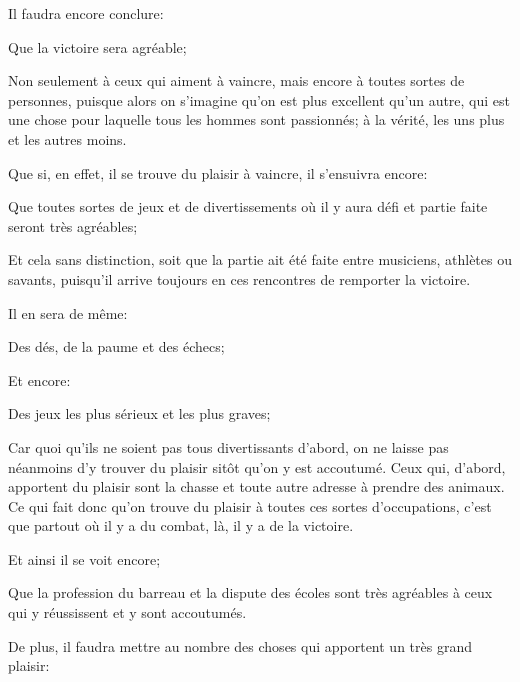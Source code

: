 \bigbreak

Il faudra encore conclure:

\begin{lieu}
	Que la victoire sera agréable;
\end{lieu}

Non seulement à ceux qui aiment à vaincre, mais encore à toutes sortes de personnes, puisque alors on s'imagine
qu'on est plus excellent qu'un autre, qui est une chose pour laquelle tous les hommes sont passionnés; à la
vérité, les uns plus et les autres moins.

\bigbreak

Que si, en effet, il se trouve du plaisir à vaincre, il s'ensuivra encore:

\begin{lieu}
	Que toutes sortes de jeux et de divertissements où il y aura défi et partie faite seront très agréables;
\end{lieu}

Et cela sans distinction, soit que la partie ait été faite entre musiciens, athlètes ou savants, puisqu'il arrive
toujours en ces rencontres de remporter la victoire.

\bigbreak

Il en sera de même:

\begin{lieu}
	Des dés, de la paume et des échecs;
\end{lieu}

Et encore:

\begin{lieu}
	Des jeux les plus sérieux et les plus graves;
\end{lieu}

Car quoi qu'ils ne soient pas tous divertissants d'abord, on ne laisse pas néanmoins d'y trouver du plaisir
sitôt qu'on y est accoutumé. Ceux qui, d'abord, apportent du plaisir sont la chasse et toute autre adresse à
prendre des animaux. Ce qui fait donc qu'on trouve du plaisir à toutes ces sortes d'occupations, c'est que
partout où il y a du combat, là, il y a de la victoire.

Et ainsi il se voit encore;

\begin{lieu}
	Que la profession du barreau et la dispute des écoles sont très agréables à ceux qui y réussissent et
	y sont accoutumés.
\end{lieu}

\bigbreak

De plus, il faudra mettre au nombre des choses qui apportent un très grand plaisir:

